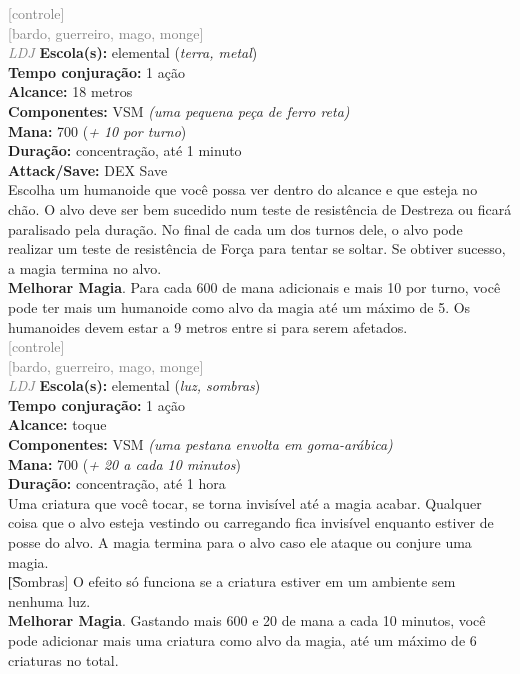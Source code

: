 \documentclass{RPG_Adventure}[2021/10/20]
\begin{document}
{\scriptsize \textcolor{gray}{[controle]\\}}
{\scriptsize \textcolor{gray}{[bardo, guerreiro, mago, monge]\\}}
{\tiny \textcolor{gray}{\textit{LDJ}}}
{\small \t \textbf{Escola(s):} elemental (\textit{terra, metal})\\\t \textbf{Tempo conjuração:} 1 ação\\\t \textbf{Alcance:} 18 metros\\\t \textbf{Componentes:} VSM \textit{(uma pequena peça de ferro reta)}\\\t \textbf{Mana:} 700 (\textit{+ 10 por turno})\\\t \textbf{Duração:} concentração, até 1 minuto\\\t \textbf{Attack/Save:} DEX Save\\}
{\normalsize Escolha um humanoide que você possa ver dentro do alcance e que esteja no chão. O alvo deve ser bem sucedido num teste de resistência de Destreza ou ficará paralisado pela duração. No final de cada um dos turnos dele, o alvo pode realizar um teste de resistência de Força para tentar se soltar. Se obtiver sucesso, a magia termina no alvo.\\\t \textbf{Melhorar Magia}. Para cada 600 de mana adicionais e mais 10 por turno, você pode ter mais um humanoide como alvo da magia até um máximo de 5. Os humanoides devem estar a 9 metros entre si para serem afetados.\\}
{\scriptsize \textcolor{gray}{[controle]\\}}
{\scriptsize \textcolor{gray}{[bardo, guerreiro, mago, monge]\\}}
{\tiny \textcolor{gray}{\textit{LDJ}}}
{\small \t \textbf{Escola(s):} elemental (\textit{luz, sombras})\\\t \textbf{Tempo conjuração:} 1 ação\\\t \textbf{Alcance:} toque\\\t \textbf{Componentes:} VSM \textit{(uma pestana envolta em goma-arábica)}\\\t \textbf{Mana:} 700 (\textit{+ 20 a cada 10 minutos})\\\t \textbf{Duração:} concentração, até 1 hora\\}
{\normalsize Uma criatura que você tocar, se torna invisível até a magia acabar. Qualquer coisa que o alvo esteja vestindo ou carregando fica invisível enquanto estiver de posse do alvo. A magia termina para o alvo caso ele ataque ou conjure uma magia.\\\t [Sombras] O efeito só funciona se a criatura estiver em um ambiente sem nenhuma luz.\\\t \textbf{Melhorar Magia}. Gastando mais 600 e 20 de mana a cada 10 minutos, você pode adicionar mais uma criatura como alvo da magia, até um máximo de 6 criaturas no total.\\}
\end{document}
